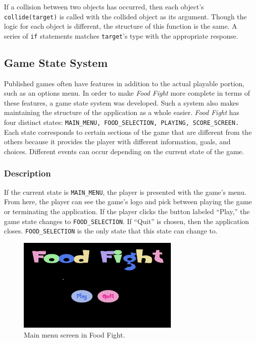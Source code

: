 \documentclass{article}
\begin{document}
If a collision between two objects has occurred, then each object's \verb+collide(target)+ is called with the collided object as its argument. Though the logic for each object is different, the structure of this function is the same. A series of \verb+if+ statements matches \verb+target+'s type with the appropriate response.

\subsection{Game State System}
Published games often have features in addition to the actual playable portion, such as an options menu. In order to make \textit{Food Fight} more complete in terms of these features, a game state system was developed. Such a system also makes maintaining the structure of the application as a whole easier. \textit{Food Fight} has four distinct states: \verb+MAIN_MENU, FOOD_SELECTION, PLAYING, SCORE_SCREEN.+ Each state corresponds to certain sections of the game that are different from the others because it provides the player with different information, goals, and choices. Different events can occur depending on the current state of the game.

\subsubsection{Description}
If the current state is \verb+MAIN_MENU+, the player is presented with the game's menu. From here, the player can see the game's logo and pick between playing the game or terminating the application. If the player clicks the button labeled ``Play,'' the game state changes to \verb+FOOD_SELECTION+. If ``Quit'' is chosen, then the application closes. \verb+FOOD_SELECTION+ is the only state that this state can change to.

\begin{figure}[H]
  \centering
    \includegraphics[width=0.7\textwidth]{mainmenu}
    \caption{Main menu screen in Food Fight.} 
\end{figure}
\end{document}
